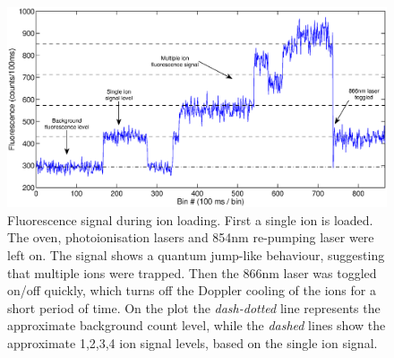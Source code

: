 %
%


\pagebreak

\begin{figure}[t]
\centering
\includegraphics[width=14.5cm]{chapter6/multiload/multiload3}
\caption[Fluorescence signal of multiple loaded ions]{Fluorescence signal during ion loading. First a single ion is loaded. The \CaI{} oven, photoionisation lasers and 854nm re-pumping laser were left on.  The signal shows a quantum jump-like  behaviour, suggesting that multiple ions were trapped. Then the 866nm laser was toggled on/off quickly, which turns off the Doppler cooling of the ions for a short period of time. On the plot the \textit{dash-dotted} line represents the approximate background count level, while the \textit{dashed} lines show the approximate 1,2,3,4 ion signal levels, based on the single ion signal.}
\label{fig:multiload}
\end{figure} 



